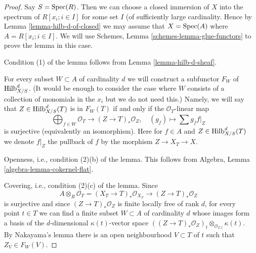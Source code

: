 \begin{proof}
Say $S = \mathop{\mathrm{Spec}}(R)$. Then we can choose a closed immersion of $X$
into the spectrum of $R[x_i; i \in I]$ for some set $I$ (of sufficiently
large cardinality. Hence by Lemma \ref{lemma-hilb-d-of-closed}
we may assume that $X = \mathop{\mathrm{Spec}}(A)$ where $A = R[x_i; i \in I]$.
We will use Schemes, Lemma \ref{schemes-lemma-glue-functors} to prove the
lemma in this case.

\medskip\noindent
Condition (1) of the lemma follows from Lemma \ref{lemma-hilb-d-sheaf}.

\medskip\noindent
For every subset $W \subset A$ of cardinality $d$ we will
construct a subfunctor $F_W$ of $\mathrm{Hilb}^d_{X/S}$.
(It would be enough to consider the case where $W$ consists of a
collection of monomials in the $x_i$ but we do not need this.)
Namely, we will say that $Z \in \mathrm{Hilb}^d_{X/S}(T)$ is in $F_W(T)$
if and only if the $\mathcal{O}_T$-linear map
$$
\bigoplus\nolimits_{f \in W} \mathcal{O}_T
\longrightarrow
(Z \to T)_*\mathcal{O}_Z,\quad
(g_f) \longmapsto \sum g_f f|_Z
$$
is surjective (equivalently an isomorphism). Here for $f \in A$
and $Z \in \mathrm{Hilb}^d_{X/S}(T)$ we denote $f|_Z$ the pullback of $f$
by the morphism $Z \to X_T \to X$.

\medskip\noindent
Openness, i.e., condition (2)(b) of the lemma. This follows from
Algebra, Lemma \ref{algebra-lemma-cokernel-flat}.

\medskip\noindent
Covering, i.e., condition (2)(c) of the lemma. Since
$$
A \otimes_R \mathcal{O}_T =
(X_T \to T)_*\mathcal{O}_{X_T} \to (Z \to T)_*\mathcal{O}_Z
$$
is surjective and since $(Z \to T)_*\mathcal{O}_Z$ is finite locally
free of rank $d$, for every point $t \in T$ we can find a finite
subset $W \subset A$ of cardinality $d$ whose images form a basis
of the $d$-dimensional $\kappa(t)$-vector space
$((Z \to T)_*\mathcal{O}_Z)_t \otimes_{\mathcal{O}_{T, t}} \kappa(t)$.
By Nakayama's lemma there is an open neighbourhood $V \subset T$
of $t$ such that $Z_V \in F_W(V)$.


\end{proof}
